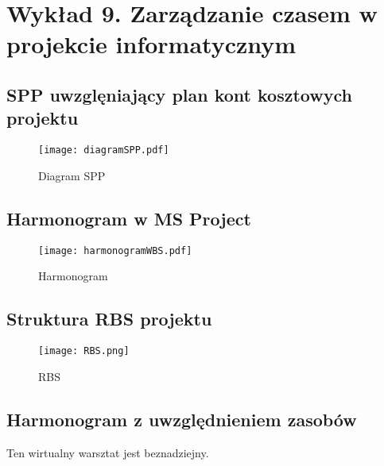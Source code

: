 ﻿\chapter{Wykład 9. Zarządzanie czasem w projekcie informatycznym}

\section{SPP uwzglęniający plan kont kosztowych projektu}

\begin{figure}[hbt]
\centering
\texttt{[image: diagramSPP.pdf]}
\caption{Diagram SPP}
\label{fig:diagramSPP}
\end{figure}


\section{Harmonogram w MS Project}

\begin{figure}[hbt]
\centering
\texttt{[image: harmonogramWBS.pdf]}
\caption{Harmonogram}
\label{fig:harmonogramWBS}
\end{figure}


\section{Struktura RBS projektu}

\begin{figure}[h]
\begin{center}
\texttt{[image: RBS.png]}
\caption[RBS]{RBS}
\label{rysunekProces}
\end{center}
\end{figure}


\section{Harmonogram z uwzględnieniem zasobów}

Ten wirtualny warsztat jest beznadziejny.


